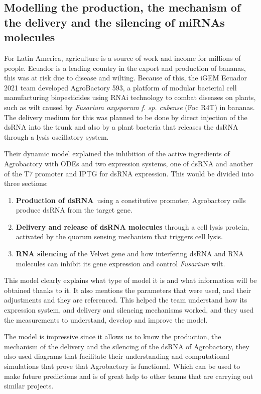 \documentclass[11pt, letterpaper, english]{article}
\begin{document}
    \subsection{Modelling the production, the mechanism of the delivery and the silencing of miRNAs molecules}
\par{For Latin America, agriculture is a source of work and income for millions of people. Ecuador is a leading country in the export and production of bananas, this was at risk due to disease and wilting. Because of this, the iGEM Ecuador 2021 team developed AgroBactory 593, a platform of modular bacterial cell manufacturing biopesticides using RNAi technology to combat diseases on plants, such as wilt caused by \textit{Fusarium oxysporum f. sp. cubense} (Foc R4T) in
bananas. The delivery medium for this was planned to be done by direct injection of the dsRNA into the trunk and also by a plant bacteria that releases the dsRNA through a lysis oscillatory system.}
\par{Their dynamic model explained the inhibition of the active ingredients of Agrobactory with ODEs and two expression systems, one of dsRNA and another of the T7 promoter and IPTG for dsRNA expression. This would be divided into three sections:}
\begin{enumerate}
            \item \textbf{Production of dsRNA} using a constitutive promoter, Agrobactory cells produce dsRNA from the target gene.
            \item \textbf{Delivery and release of dsRNA molecules} through a cell lysis protein, activated by the quorum sensing mechanism that triggers cell lysis.
            \item \textbf{RNA silencing} of the Velvet gene and how interfering dsRNA and RNA molecules can inhibit its gene expression and control \textit{Fusarium} wilt.
\end{enumerate}
\par{This model clearly explains what type of model it is and what information will be obtained thanks to it. It also mentions the parameters that were used, and their adjustments and they are referenced. This helped the team understand how its expression system, and delivery and silencing mechanisms worked, and they used the measurements to understand, develop and improve the model.}
\par{The model is impressive since it allows us to know the production, the mechanism of the delivery and the silencing of the dsRNA of Agrobactory, they also used diagrams that facilitate their understanding and computational simulations that prove that Agrobactory is functional. Which can be used to make future predictions and is of great help to other teams that are carrying out similar projects.}
\end{document}
